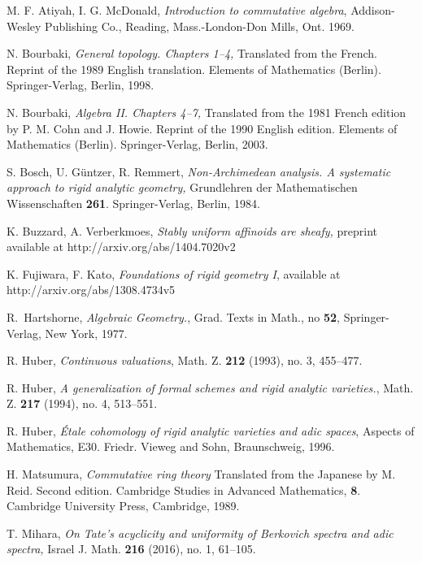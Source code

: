 \begin{thebibliography}{BGR84}


{M. F. Atiyah, I. G. McDonald},
{\em Introduction to commutative algebra}, 
{Addison-Wesley Publishing Co., Reading, Mass.-London-Don Mills, Ont. 1969}.


{N. Bourbaki},
{\em General topology. Chapters 1--4,} 
Translated from the French. Reprint of the 1989 English translation. Elements of Mathematics (Berlin). Springer-Verlag, Berlin, 1998.


{N. Bourbaki},
{\em Algebra II. Chapters 4--7,} 
Translated from the 1981 French edition by P. M. Cohn and J. Howie. Reprint of the 1990 English edition.  Elements of Mathematics (Berlin). Springer-Verlag, Berlin, 2003.






{S. Bosch, U. G\"{u}ntzer, R. Remmert},
{\em Non-Archimedean analysis. A systematic approach to rigid analytic geometry,} 
{Grundlehren der Mathematischen Wissenschaften {\textbf{261}}. Springer-Verlag, Berlin, 1984. }



{K. Buzzard, A. Verberkmoes},
{\em Stably uniform affinoids are sheafy,}
{preprint available at http://arxiv.org/abs/1404.7020v2}





{K. Fujiwara, F. Kato},
{\em Foundations of rigid geometry I},
{available at http://arxiv.org/abs/1308.4734v5}



{R.~Hartshorne},
{\em Algebraic Geometry.},
{Grad. Texts in Math., no {\textbf{52}}, Springer-Verlag, New York, 1977}.




{R. Huber},
{\em Continuous valuations},
{Math. Z. {\textbf{212}} (1993), no. 3, 455--477}.

{R. Huber},
{\em A generalization of formal schemes and rigid analytic varieties.},
{ Math. Z. {\textbf{217}} (1994), no. 4, 513--551}.



{R. Huber},
{\em \'{E}tale cohomology of rigid analytic varieties and adic spaces},
{Aspects of Mathematics, E30. Friedr. Vieweg and Sohn, Braunschweig, 1996.}



{H. Matsumura},
{\em Commutative ring theory}
{Translated from the Japanese by M. Reid. Second edition. Cambridge Studies in Advanced Mathematics, 
{\textbf{8}}. Cambridge University Press, Cambridge, 1989.}


{T. Mihara},
{\em On Tate's acyclicity and uniformity of Berkovich spectra and adic spectra,}
{Israel J. Math. {\textbf{216}} (2016), no. 1, 61--105.}


\end{thebibliography}